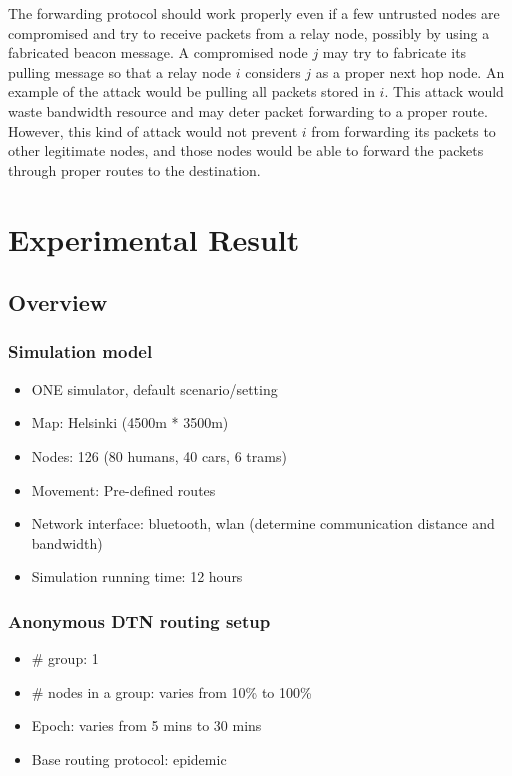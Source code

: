 \documentclass[11pt]{article}
\begin{document}
The forwarding protocol should work properly even if a few untrusted nodes are compromised and try to receive packets from a relay node, possibly by using a fabricated beacon message. 
A compromised node $j$ may try to fabricate its pulling message so that a relay node $i$ considers $j$ as a proper next hop node. 
An example of the attack would be pulling all packets stored in $i$. 
This attack would waste bandwidth resource and may deter packet forwarding to a proper route. 
However, this kind of attack would not prevent $i$ from forwarding its packets to other legitimate nodes, and those nodes would be able to forward the packets through proper routes to the destination.


\section{Experimental Result}
\subsection{Overview}

\subsubsection{Simulation model}
\begin{itemize}
 \item ONE simulator, default scenario/setting
 \item Map: Helsinki (4500m * 3500m)
 \item Nodes: 126 (80 humans, 40 cars, 6 trams)
 \item Movement: Pre-defined routes
 \item Network interface: bluetooth, wlan (determine communication distance and bandwidth)
 \item Simulation running time: 12 hours
\end{itemize}

\subsubsection{Anonymous DTN routing setup}
\begin{itemize}
 \item \# group: 1
 \item \# nodes in a group: varies from 10\% to 100\%
 \item Epoch: varies from 5 mins to 30 mins
 \item Base routing protocol: epidemic
\end{itemize}
\end{document}
